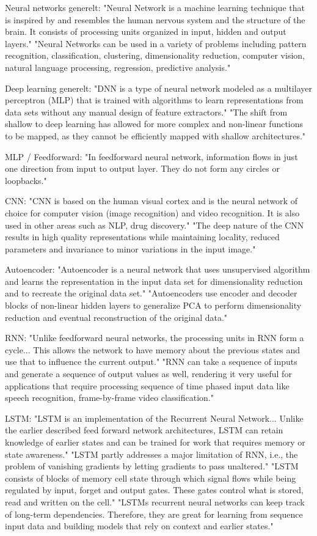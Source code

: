 Neural networks generelt:
"Neural Network is a machine learning technique that is inspired by and resembles the human nervous system and the structure of the brain. It consists of processing units organized in input, hidden and output layers."
"Neural Networks can be used in a variety of problems including pattern recognition, classification, clustering, dimensionality reduction, computer vision, natural language processing, regression, predictive analysis."

Deep learning generelt:
"DNN is a type of neural network modeled as a multilayer perceptron (MLP) that is trained with algorithms to learn representations from data sets without any manual design of feature extractors."
"The shift from shallow to deep learning has allowed for more complex and non-linear functions to be mapped, as they cannot be efficiently mapped with shallow architectures."

MLP / Feedforward:
"In feedforward neural network, information flows in just one direction from input to output layer. They do not form any circles or loopbacks."

CNN:
"CNN is based on the human visual cortex and is the neural network of choice for computer vision (image recognition) and video recognition. It is also used in other areas such as NLP, drug discovery."
"The deep nature of the CNN results in high quality representations while maintaining locality, reduced parameters and invariance to minor variations in the input image."

Autoencoder:
"Autoencoder is a neural network that uses unsupervised algorithm and learns the representation in the input data set for dimensionality reduction and to recreate the original data set."
"Autoencoders use encoder and decoder blocks of non-linear hidden layers to generalize PCA to perform dimensionality reduction and eventual reconstruction of the original data."

RNN:
"Unlike feedforward neural networks, the processing units in RNN form a cycle... This allows the network to have memory about the previous states and use that to influence the current output."
"RNN can take a sequence of inputs and generate a sequence of output values as well, rendering it very useful for applications that require processing sequence of time phased input data like speech recognition, frame-by-frame video classification."

LSTM:
"LSTM is an implementation of the Recurrent Neural Network... Unlike the earlier described feed forward network architectures, LSTM can retain knowledge of earlier states and can be trained for work that requires memory or state awareness."
"LSTM partly addresses a major limitation of RNN, i.e., the problem of vanishing gradients by letting gradients to pass unaltered."
"LSTM consists of blocks of memory cell state through which signal flows while being regulated by input, forget and output gates. These gates control what is stored, read and written on the cell."
"LSTMs recurrent neural networks can keep track of long-term dependencies. Therefore, they are great for learning from sequence input data and building models that rely on context and earlier states."


